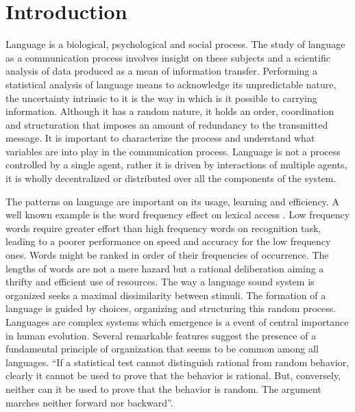 \chapter{Introduction}
Language is a biological, psychological and social process. 
The study of language as a communication process involves insight on these subjects 
and a scientific analysis of data produced as a mean of information transfer. 
Performing a statistical analysis of language means 
to acknowledge its unpredictable nature, the uncertainty intrinsic to it is the 
way in which is it possible to carrying information.
Although it has a random nature, 
it holds an order, coordination and structuration that 
imposes an amount of redundancy to the transmitted message.
It is important to characterize the process and understand what variables 
are into play in the communication process.
Language is not a process controlled by a single agent, rather it is 
driven by interactions of multiple agents, it is wholly decentralized or distributed 
over all the components of the system.

The patterns on language are important on its usage, learning and efficiency.
A well known example is the word frequency effect on lexical access \citep{whaley1978,grainger90,saly1989}.
Low frequency words require greater effort than high frequency words on recognition task,
leading to a poorer performance on speed and accuracy for the low frequency ones.
Words might be ranked in order of their frequencies of occurrence.
The lengths of words are not a mere hazard 
but a rational deliberation aiming a thrifty and efficient use of resources. 
The way a language sound system is organized seeks a maximal dissimilarity between stimuli. 
The formation of a language is guided by choices, organizing and
structuring this random process. Languages are complex systems which emergence is
a event of central importance in human evolution. Several remarkable features suggest the presence of
a fundamental principle of organization that seems to be common among all languages.
``If a statistical test cannot distinguish rational from random behavior, clearly it cannot 
be used to prove that the behavior is rational. But, conversely, neither can it be used to 
prove that the behavior is random. The argument marches neither forward nor backward''\citep{miller1965}.

